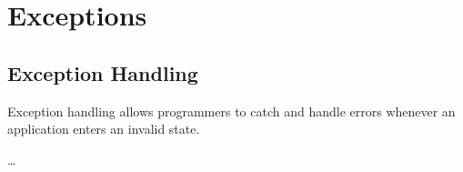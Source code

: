 \chapter{Exceptions}

\section{Exception Handling}
Exception handling allows programmers to catch and handle errors whenever an application enters an invalid state.

\dots 

